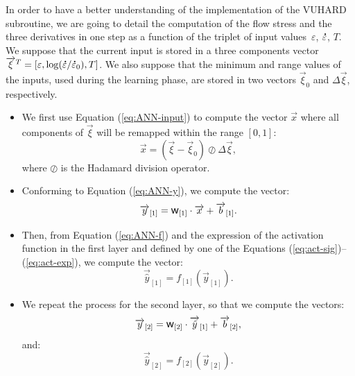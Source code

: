 \documentclass[algorithms,article,accept,pdftex,oneauthor]{Definitions/mdpi}
\DeclareRobustCommand{\w}{\mbox{\large\ensuremath{\mathsf{w}}}}
\DeclareRobustCommand{\lay}[1]{_{[#1]}}
\DeclareRobustCommand{\mdot}[1]{\accentset{\mbox{\bfseries .}}{#1}}
\begin{document}
In order to have a better understanding of the implementation of the VUHARD subroutine, we are going to detail the computation of the flow stress and the three derivatives in one step as a function of the triplet of input values~$\varepsilon$, $\mdot{\varepsilon}$, $T$.
We suppose that the current input is stored in a three components vector $\overrightarrow{\xi}^T=\left[\varepsilon, \log(\mdot{\varepsilon}/\mdot{\varepsilon}_{0}), T\right]$.
We also suppose that the minimum and range values of the inputs, used during the learning phase, are stored in two vectors $\overrightarrow{\xi}_{0}$ and $\Delta\overrightarrow{\xi}$, respectively.
\begin{itemize}[align=parleft,leftmargin=*,labelsep=5.mm]
\item We first use Equation (\ref{eq:ANN-input}) to compute the vector $\overrightarrow{x}$ where all components of $\overrightarrow{\xi}$ will be remapped within the range $[0,1]$:
\begin{equation}
\overrightarrow{x}=\left(\overrightarrow{\xi}-\overrightarrow{\xi}_{0}\right)\oslash\Delta\overrightarrow{\xi}, \label{eq:ANNi1}
\end{equation}
where $\oslash$ is the Hadamard division operator.
\item Conforming to Equation (\ref{eq:ANN-y}), we compute the vector:
\begin{equation}
\overrightarrow{y}\lay{1}=\w\lay{1}\cdot\overrightarrow{x}+\overrightarrow{b}\lay{1}.\label{eq:ANNi2}
\end{equation}
\item Then, from Equation (\ref{eq:ANN-f}) and the expression of the activation function in the first layer and defined by one of the Equations (\ref{eq:act-sig})--(\ref{eq:act-exp}), we compute the vector:
\begin{equation}
\overrightarrow{\hat{y}}\lay{1}=f\lay{1}(\overrightarrow{y}\lay{1}).\label{eq:ANNi3}
\end{equation}
\item We repeat the process for the second layer, so that we compute the vectors: \begin{equation}
\overrightarrow{y}\lay{2}=\w\lay{2}\cdot\overrightarrow{\hat{y}}\lay{1}+\overrightarrow{b}\lay{2},\label{eq:ANNi4}
\end{equation}
and:
\begin{equation}
\overrightarrow{\hat{y}}\lay{2}=f\lay{2}(\overrightarrow{y}\lay{2}).\label{eq:ANNi5}

\end{equation}
\end{itemize}
\end{document}
